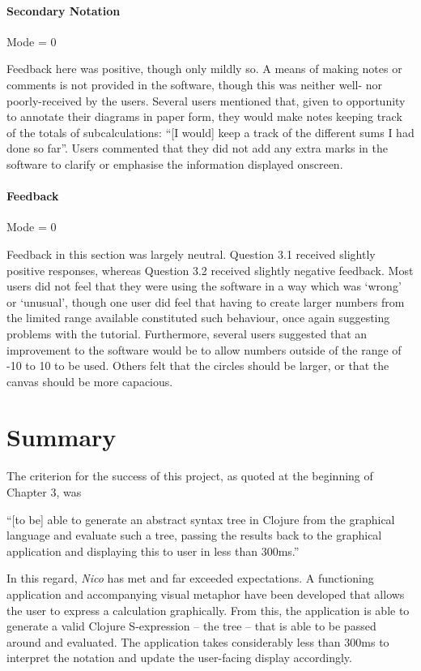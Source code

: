 \documentclass[12pt,twoside,notitlepage,xetex]{report}
\begin{document}
{\paragraph{Secondary Notation}\hfill

Mode = 0

Feedback here was positive, though only mildly so.  A means of making notes or comments is not provided in the software, though this was neither well- nor poorly-received by the users.  Several users mentioned that, given to opportunity to annotate their diagrams in paper form, they would make notes keeping track of the totals of subcalculations: ``[I would] keep a track of the different sums I had done so far''.  Users commented that they did not add any extra marks in the software to clarify or emphasise the information displayed onscreen.

\paragraph{Feedback}\hfill

Mode = 0

Feedback in this section was largely neutral.  Question 3.1 received slightly positive responses, whereas Question 3.2 received slightly negative feedback.  Most users did not feel that they were using the software in a way which was `wrong' or `unusual', though one user did feel that having to create larger numbers from the limited range available constituted such behaviour, once again suggesting problems with the tutorial.  Furthermore, several users suggested that an improvement to the software would be to allow numbers outside of the range of -10 to 10 to be used.  Others felt that the circles should be larger, or that the canvas should be more capacious.

\section{Summary}
The criterion for the success of this project, as quoted at the beginning of Chapter 3, was
\begin{center}
\parbox[c]{\textwidth-2cm}{
\small
``[to be] able to generate an abstract syntax tree in Clojure from the graphical language and evaluate such a tree, passing the results back to the graphical application and displaying this to user in less than 300ms.''
}
\end{center}
In this regard, \emph{Nico} has met and far exceeded expectations.  A functioning application and accompanying visual metaphor have been developed that allows the user to express a calculation graphically.  From this, the application is able to generate a valid Clojure S-expression -- the tree -- that is able to be passed around and evaluated.  The application takes considerably less than 300ms to interpret the notation and update the user-facing display accordingly.

}
\end{document}
